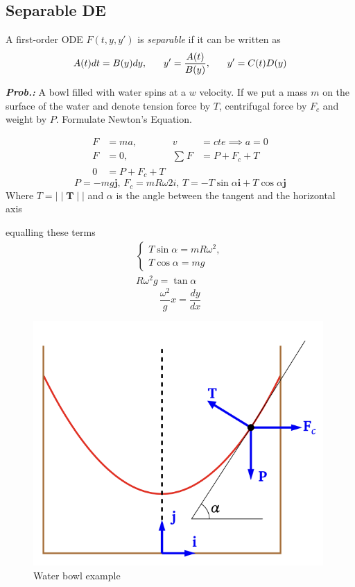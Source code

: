 \documentclass[a4paper]{article}
\begin{document}
\subsection{Separable DE}
A first-order ODE $F(t,y,y')$ is \textit{separable} if it can be written as
$$
A(t)dt=B(y)dy,\hspace{4ex}y'=\frac{A(t)}{B(y)},\hspace{4ex}y'=C(t)D(y)
$$

\vspace{2ex}\textit{\textbf{Prob.:}} A bowl filled with water spins at a $w$ velocity. If we put a mass $m$ on the surface of the water and denote tension force by $T$, centrifugal force by $F_{c}$ and weight by $P$. Formulate Newton's Equation.

\begin{align}
F&=ma, & v&=cte\implies a=0 \\
F&=0, & \sum^{}_{}F&=P+F_{c}+T \\
0&= P+F_{c}+T
\end{align}
$$
P=-mg\mathbf{j},\, F_{c}=mR\omega 2i,\, T=-T\sin \alpha \mathbf{i} + T\cos \alpha \mathbf{j}
$$
Where $T=\mid\mid \mathbf{T}\mid\mid$ and $\alpha$ is the angle between the tangent and the horizontal axis

\begin{minipage}{0.4\textwidth}
equalling these terms
\begin{align}
\begin{cases}
T\sin \alpha=mR\omega^{2}, \\
T\cos \alpha=mg
\end{cases} \\
R\omega^{2}g=\tan \alpha
\end{align}
$$
\boxed{\frac{\omega^{2}}{g}x=\frac{dy}{dx}}
$$
\end{minipage} \hfill \begin{minipage}{0.4\linewidth}
\begin{figure}[H]
    \centering
    \includegraphics[width=\textwidth]{IMG/ex_water.png}
    \caption{Water bowl example}
    \label{fig:ex_water}
\end{figure}
\end{minipage}
\end{document}
